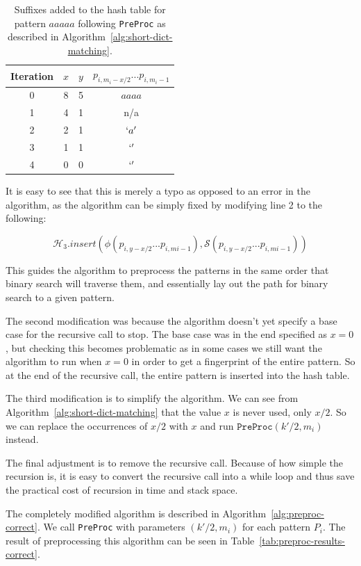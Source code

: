 \documentclass[ %
                    author={Dominic Joseph Moylett},
                    degree={MEng},
                     title={Dictionary Matching with Fingerprints},
                  subtitle={An Empirical Analysis},
                      type={research},
                      year={2015} ]{dissertation}
\begin{document}
\begin{table}[t]
  \centering
  \begin{tabular}{|c|c|c|c|}
    \hline
    Iteration & $x$ & $y$ & $p_{i, m_i-x/2}...p_{i, m_i - 1}$ \\\hline
    0 & 8 & 5 & $aaaa$ \\\hline
    1 & 4 & 1 & n/a \\\hline
    2 & 2 & 1 & $`a'$ \\\hline
    3 & 1 & 1 & $`'$ \\\hline
    4 & 0 & 0 & $`'$ \\\hline
  \end{tabular}
  \caption{Suffixes added to the hash table for pattern $aaaaa$ following \texttt{PreProc} as described in Algorithm~\ref{alg:short-dict-matching}.}
  \label{tab:preproc-results-incorrect}
\end{table}

It is easy to see that this is merely a typo as opposed to an error in the algorithm, as the algorithm can be simply fixed by modifying line 2 to the following:

$$\mathcal{H}_3.insert(\phi(p_{i, y - x/2}...p_{i, m{i} - 1}), \mathcal{S}(p_{i, y - x/2}...p_{i, m{i} - 1}))$$

This guides the algorithm to preprocess the patterns in the same order that binary search will traverse them, and essentially lay out the path for binary search to a given pattern.

The second modification was because the algorithm doesn't yet specify a base case for the recursive call to stop. The base case was in the end specified as $x = 0$, but checking this becomes problematic as in some cases we still want the algorithm to run when $x = 0$ in order to get a fingerprint of the entire pattern. So at the end of the recursive call, the entire pattern is inserted into the hash table.

The third modification is to simplify the algorithm. We can see from Algorithm~\ref{alg:short-dict-matching} that the value $x$ is never used, only $x/2$. So we can replace the occurrences of $x/2$ with $x$ and run $\texttt{PreProc}(k'/2, m_i)$ instead.

The final adjustment is to remove the recursive call. Because of how simple the recursion is, it is easy to convert the recursive call into a while loop and thus save the practical cost of recursion in time and stack space.

The completely modified algorithm is described in Algorithm~\ref{alg:preproc-correct}. We call \texttt{PreProc} with parameters $(k'/2, m_i)$ for each pattern $P_i$. The result of preprocessing this algorithm can be seen in Table~\ref{tab:preproc-results-correct}.
\end{document}
